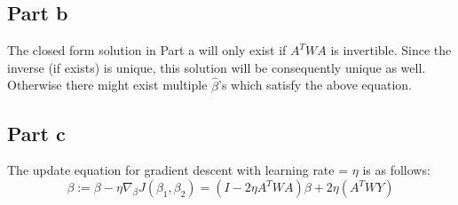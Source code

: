 \documentclass{article}
\begin{document}
\subsection*{Part b}
The closed form solution in Part a will only exist if \(A^{T}WA\) is invertible. Since the inverse (if exists) is unique, this solution will be consequently unique as well. Otherwise there might exist multiple \(\hat{\beta}\)'s which satisfy the above equation.

\subsection*{Part c}
The update equation for gradient descent with learning rate = \(\eta\) is as follows:
\begin{equation}
\beta := \beta - \eta \nabla_{\beta}J(\beta_{1}, \beta_{2}) = (I - 2\eta A^{T}WA)\beta + 2\eta(A^{T}WY)
\end{equation}
\end{document}
